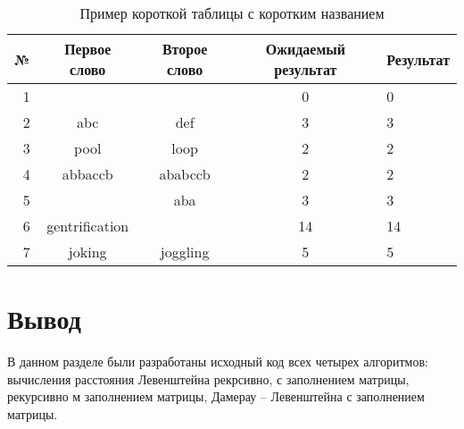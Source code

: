 \begin{table}[ht]
  \caption{Пример короткой таблицы с коротким названием}
  \begin{tabular}{|r|c|c|c|l|}
  \hline
  №      & Первое слово & Второе слово  & Ожидаемый результат &  Результат \\
  \hline
  1  &     &     & 0 & 0            \\
    \hline
  2  & abc   & def    & 3 & 3         \\
    \hline
  3  & pool   & loop    & 2 & 2         \\
    \hline
  4  & abbaccb  & ababccb   & 2  & 2         \\
    \hline
  5  &   & aba   & 3  & 3         \\
  \hline
    6  &  gentrification &    & 14  & 14         \\
      \hline
    7  &  joking &  joggling  & 5  & 5         \\
  \hline
  \end{tabular}
  \label{tab:tabular}
\end{table}

\section{Вывод}

В данном разделе были разработаны исходный код всех четырех алгоритмов: вычисления расстояния Левенштейна рекрсивно, с заполнением матрицы, рекурсивно м заполнением матрицы, Дамерау -- Левенштейна с заполнением матрицы. 

